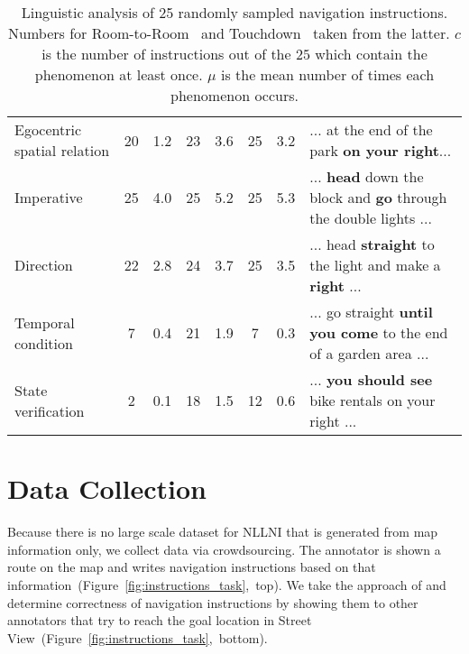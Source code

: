 \documentclass[11pt,a4paper]{article}
\begin{document}
\begin{table*}
{\begin{tabular}{|l|cc|cc|cc|l|}
Egocentric spatial relation                                & 20               & 1.2               & 23                & 3.6                 & 25               & 3.2                & ... at the end of the park \textbf{on your right}...                           \\
Imperative                                                 & 25               & 4.0               & 25                & 5.2                 & 25               & 5.3                & ... \textbf{head} down the block and \textbf{go} through the double lights ... \\
Direction                                                  & 22               & 2.8               & 24                & 3.7                 & 25               & 3.5                & ... head \textbf{straight} to the light and make a \textbf{right} ...          \\
Temporal condition                                         & 7                & 0.4               & 21                & 1.9                 & 7                & 0.3                & ... go straight \textbf{until you come} to the end of a garden area ...        \\
State verification                                         & 2                & 0.1               & 18                & 1.5                 & 12               & 0.6                & ... \textbf{you should see} bike rentals on your right ...                     \\ \hline
\end{tabular}}
\caption{Linguistic analysis of 25 randomly sampled navigation instructions. Numbers for Room-to-Room~\citep{room2room} and Touchdown~\citep{chen-etal-2019-touchdown} taken from the latter. $c$ is the number of instructions out of the $25$ which contain the phenomenon at least once. $\mu$ is the mean number of times each phenomenon occurs.}
\label{tab:linguistics}
\end{table*} \section{Data Collection}
Because there is no large scale dataset for NLLNI that is generated from map information only, we collect data via crowdsourcing. The annotator is shown a route on the map and writes navigation instructions based on that information~(Figure~\ref{fig:instructions_task},~top). We take the approach of \citet{chen-etal-2019-touchdown} and determine correctness of navigation instructions by showing them to other annotators that try to reach the goal location in Street View~(Figure~\ref{fig:instructions_task},~bottom).
\end{document}
